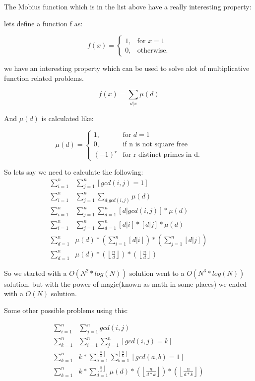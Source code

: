    The Mobius function which is in the list above have a really interesting property:

    lets define a function f as:

    $$
        f(x) = 
      \begin{cases}
        1, & \text{for } x = 1 \\
        0, & \text{otherwise.} 
      \end{cases}
    $$
    
    we have an interesting property which can be used to solve alot of multiplicative function related problems.

    $$
        f(x)  = \sum_{d|x}\mu(d)
    $$

    And $\mu(d)$ is calculated like:

    $$
        \mu(d) = 
    \begin{cases}
        1, & \text{for } d = 1 \\
        0, & \text{if n is not square free} \\
        (-1)^r & \text{for r distinct primes in d.}
    \end{cases}
    $$


    So lets say we need to calculate the following:
    \begin{align*}
        \sum_{i=1}^{n}& \sum_{j=1}^{n} [gcd(i,j) = 1] \\
        \sum_{i=1}^{n}& \sum_{j=1}^{n} \sum_{d|gcd(i,j)}\mu(d) \\
        \sum_{i=1}^{n}& \sum_{j=1}^{n} \sum_{d = 1}^{n} [d|gcd(i,j)]*\mu(d) \\
        \sum_{i=1}^{n}& \sum_{j=1}^{n} \sum_{d = 1}^{n} [d|i]*[d|j]*\mu(d) \\
       \sum_{d = 1}^{n}& \mu(d) * (\sum_{i=1}^{n}[d|i]) * (\sum_{j=1}^{n}[d|j]) \\
       \sum_{d = 1}^{n}& \mu(d) * (\left\lfloor \frac{n}{d} \right\rfloor) * (\left\lfloor \frac{n}{d} \right\rfloor) 
    \end{align*}

    So we started with a $O(N^2 * log(N))$ solution went to a $O(N^3 * log(N))$ solution, 
    but with the power of magic(known as math in some places) we ended with a $O(N)$ solution.

    Some other possible problems using this:
    
    \begin{align*}
        \sum_{i=1}^{n}& \sum_{j=1}^{n} gcd(i,j) \\
        \sum_{k=1}^{n}& \sum_{i=1}^{n} \sum_{j=1}^{n} [gcd(i,j) = k] \\
        \sum_{k=1}^{n}& k * \sum_{a=1}^{\left\lfloor \frac{n}{k} \right\rfloor} 
        \sum_{b=1}^{\left\lfloor \frac{n}{k} \right\rfloor} [gcd(a,b) = 1] \\
        \sum_{k=1}^{n}& k * \sum_{d = 1}^{\left\lfloor \frac{n}{k} \right\rfloor} \mu(d) * (\left\lfloor \frac{n}{d*k} \right\rfloor) * (\left\lfloor \frac{n}{d*k} \right\rfloor) 
    \end{align*}

